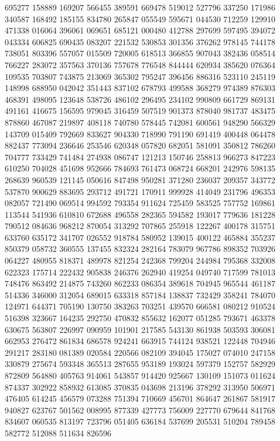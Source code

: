{695277 158889 169207 566455 389591 669478 519012 527796 337250 171986 340587%
168492 185155 834780 265847 055549 595671 044530 712259 129910 471338 016064%
396061 069651 685121 000480 412788 297699 597495 394072 043334 606825 690435%
083207 221532 530853 301356 376262 978145 744178 738051 803396 557057 015509%
720005 618513 366855 907043 382436 058514 766227 283072 357563 370136 757678%
776548 844444 620934 385620 076364 109535 703807 743875 213069 365302 795247%
396456 886316 523110 245119 148998 688950 042042 351443 837102 678793 499588%
368279 974389 876303 468391 498095 123648 538726 486102 296495 234102 990809%
661729 869131 491161 416675 156595 979045 316459 507519 901373 878040 981737%
483475 878860 467087 219897 408118 740780 578445 742081 600561 948290 566329%
143709 015409 792669 833627 904330 718990 791190 691419 400448 064478 882437%
773094 236646 253546 620348 057820 682051 581091 350812 786260 704777 733429%
741484 274938 086747 121213 150746 258813 966273 847223 610250 704028 451698%
952666 784693 761473 068724 668201 242976 598135 268639 960539 121145 050616%
847498 950281 371280 236037 209357 343772 537870 900629 883695 293712 491721%
170911 999928 414049 231796 496353 082057 721490 069514 994592 793354 911624%
725459 583525 757752 169861 113544 541936 610810 672688 496558 282365 594582%
193017 779636 181228 790512 084636 968212 870054 313292 707865 255918 122267%
400178 315751 633760 635172 341707 026552 918784 580952 139015 400122 465884%
355237 850379 058732 360555 137455 832324 282164 783079 967786 898352 703926%
064227 480955 818371 489978 821254 242368 799204 244984 795368 332008 622323%
175714 222432 905838 246376 262940 419254 049740 717599 781013 748476 863492%
214875 743260 862233 086354 389618 704945 965544 461187 514336 346000 312054%
689015 633318 857184 138837 732429 358241 784070 124971 644371 705190 130750%
383263 703251 439570 666581 080212 910524 516398 323667 164235 292750 470832%
855632 162077 051285 793671 463378 630675 563807 226997 090959 101901 217585%
543130 861938 503593 306081 662953 276472 861834 686578 924241 663915 744124%
938521 122448 704946 291217 283180 081389 020584 220566 082109 394045 175027%
074010 247158 330879 275674 593348 365513 287655 953189 193024 597379 152757%
582929 872809 564880 405763 914061 543857 914420 925667 130109 151073 011624%
874337 302922 858932 613085 370835 043698 213196 378292 313950 506971 476405%
614245 456579 073288 751394 710669 456701 864647 261867 581917 940827 623767%
501562 008995 877339 427773 756009 227770 679644 841768 834607 060535 813197%
723796 051405 636184 537699 205531 510204 789458 582772 512088 511634 826596%
}
